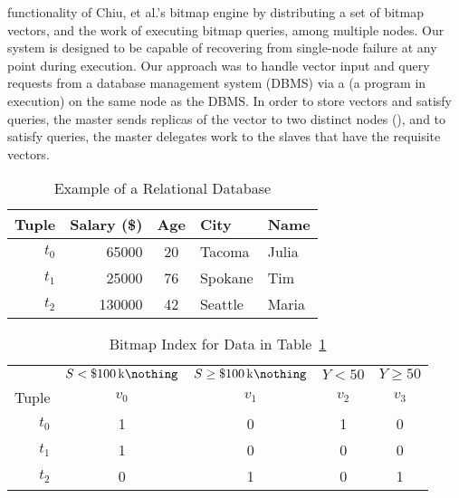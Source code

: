 functionality of Chiu, et al.'s bitmap engine by distributing a set of bitmap
vectors, and the work of executing bitmap queries, among multiple nodes. Our
system is designed to be capable of recovering from single-node failure at any
point during execution. Our approach was to handle vector input and query
requests from a database management system (DBMS) via a 
 (a program in execution) on the same node as the
DBMS. In order to store vectors and satisfy queries, the master sends
replicas of the vector to two distinct nodes (), and to satisfy
queries, the master delegates work to the slaves that have the requisite
vectors.
\par
%
\begin{table}
    \centering
    \caption{Example of a Relational Database}
    \label{table:census-relational}
    \begin{tabular}{@{}r||rcll@{}}
        \toprule
        Tuple   & Salary (\$)  & Age & City    & Name  \\
        \midrule
        \(t_0\) & \num{65000}  & 20  & Tacoma  & Julia \\
        \(t_1\) & \num{25000}  & 76  & Spokane & Tim   \\
        \(t_2\) & \num{130000} & 42  & Seattle & Maria \\
        \bottomrule
    \end{tabular}
\end{table}
%
\begin{table}
    \centering
    \caption{Bitmap Index for Data in Table~\ref{table:census-relational}}
    \label{table:census-bitmap}
    \begin{tabular}{@{}r||cc|cc@{}}
        \toprule
                & \(S < \SI{100}[\$]{\kilo\nothing}\)
                & \(S \geq \SI{100}[\$]{\kilo\nothing}\)
                & \(Y < 50\) & \(Y \geq 50\) \\
        Tuple   & \(v_0\)    & \(v_1\)       & \(v_2\)    & \(v_3\)       \\
        \midrule
        \(t_0\) & 1          & 0             & 1          & 0             \\
        \(t_1\) & 1          & 0             & 0          & 0             \\
        \(t_2\) & 0          & 1             & 0          & 1             \\
        \bottomrule
    \end{tabular}
\end{table}
